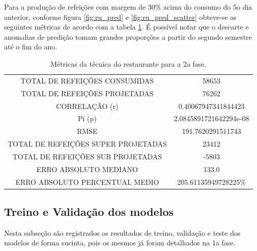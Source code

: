 \documentclass[	12pt, Times, openright, twoside, a4paper, english, brazil]{abntex2}
\begin{document}
                Para a produção de refeições com margem de 30\% acima do consumo do 5o dia anterior, conforme figura \ref{fig:ru_pred} e \ref{fig:ru_pred_scatter} obteve-se as seguintes métricas de acordo com a tabela \ref{table:case2_rupred}. É possível notar que o descarte e anomalias de predição tomam grandes proporções a partir do segundo semestre até o fim do ano.
                \begin{table}[!ht]
                \centering
                \caption{Métricas da técnica do restaurante para a 2a fase.}
                \label{table:case2_rupred}
                    \begin{tabular}{|c|c|}
                    \rowcolor{gray!50}
                    \hline
                    \multicolumn{2}{c}{Consumo com margem 30\% acima do 5o dia anterior}\\ \hline     
                    TOTAL DE REFEIÇÕES CONSUMIDAS & 58653  \\
                TOTAL DE REFEIÇÕES PROJETADAS & 76262 \\ 
                CORRELAÇÃO (r)&  0.40067947341844423 \\
                Pi (p) & 2.0845891721642294e-08\\
                RMSE & 191.7620291511743 \\
                TOTAL DE REFEIÇÕES SUPER PROJETADAS & 23412 \\
                TOTAL DE REFEIÇÕES SUB PROJETADAS & -5803 \\
                ERRO ABSOLUTO MEDIANO & 133.0 \\
                ERRO ABSOLUTO PERCENTUAL MEDIO & 205.61135949728225\% \\  \hline \end{tabular}\end{table}
                
    	\subsection{Treino e Validação dos modelos}
    	    Nesta subseção são registrados os resultados de treino, validação e teste dos modelos de forma sucinta, pois os mesmos já foram detalhados na 1a fase.\\
    	 
\end{document}
